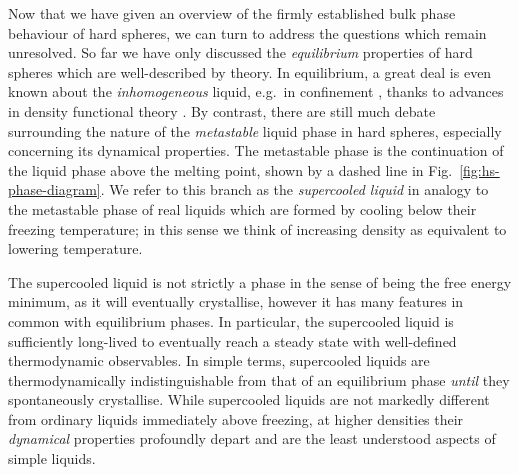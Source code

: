 \documentclass[11pt,twoside]{report}
\begin{document}
Now that we have given an overview of the firmly established bulk phase behaviour of hard spheres, we can turn to address the questions which remain unresolved.
So far we have only discussed the \emph{equilibrium} properties of hard spheres which are well-described by theory.
In equilibrium, a great deal is even known about the \emph{inhomogeneous} liquid, e.g.\ in confinement \cite{GonzalezJCP1998}, thanks to advances in density functional theory \cite{RosenfeldPRL1989,RothJPCM2010}.
By contrast, there are still much debate surrounding the nature of the \emph{metastable} liquid phase in hard spheres, especially concerning its dynamical properties.
The metastable phase is the continuation of the liquid phase above the melting point, shown by a dashed line in Fig.\ \ref{fig:hs-phase-diagram}.
We refer to this branch as the \emph{supercooled liquid} in analogy to the metastable phase of real liquids which are formed by cooling below their freezing temperature; in this sense we think of increasing density as equivalent to lowering temperature.

The supercooled liquid is not strictly a phase in the sense of being the free energy minimum, as it will eventually crystallise, however it has many features in common with equilibrium phases.
In particular, the supercooled liquid is sufficiently long-lived to eventually reach a steady state with well-defined thermodynamic observables.
In simple terms, supercooled liquids are thermodynamically indistinguishable from that of an equilibrium phase \emph{until} they spontaneously crystallise.
While supercooled liquids are not markedly different from ordinary liquids immediately above freezing, at higher densities their \emph{dynamical} properties profoundly depart and are the least understood aspects of simple liquids.
\end{document}
